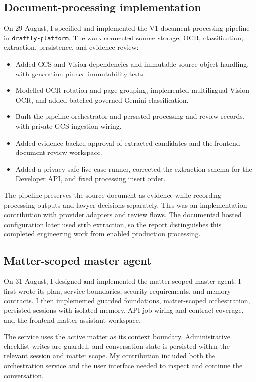 \documentclass[11pt,a4paper]{article}
\newcommand{\repo}[1]{\texttt{\nolinkurl{#1}}}
\begin{document}
\subsection{Document-processing implementation}
On 29 August, I specified and implemented the V1 document-processing pipeline in \repo{draftly-platform}. The work connected source storage, OCR, classification, extraction, persistence, and evidence review:
\begin{itemize}
\item Added GCS and Vision dependencies and immutable source-object handling, with generation-pinned immutability tests.
\item Modelled OCR rotation and page grouping, implemented multilingual Vision OCR, and added batched governed Gemini classification.
\item Built the pipeline orchestrator and persisted processing and review records, with private GCS ingestion wiring.
\item Added evidence-backed approval of extracted candidates and the frontend document-review workspace.
\item Added a privacy-safe live-case runner, corrected the extraction schema for the Developer API, and fixed processing insert order.
\end{itemize}
The pipeline preserves the source document as evidence while recording processing outputs and lawyer decisions separately. This was an implementation contribution with provider adapters and review flows. The documented hosted configuration later used stub extraction, so the report distinguishes this completed engineering work from enabled production processing.

\subsection{Matter-scoped master agent}
On 31 August, I designed and implemented the matter-scoped master agent. I first wrote its plan, service boundaries, security requirements, and memory contracts. I then implemented guarded foundations, matter-scoped orchestration, persisted sessions with isolated memory, API job wiring and contract coverage, and the frontend matter-assistant workspace.

The service uses the active matter as its context boundary. Administrative checklist writes are guarded, and conversation state is persisted within the relevant session and matter scope. My contribution included both the orchestration service and the user interface needed to inspect and continue the conversation.
\end{document}

